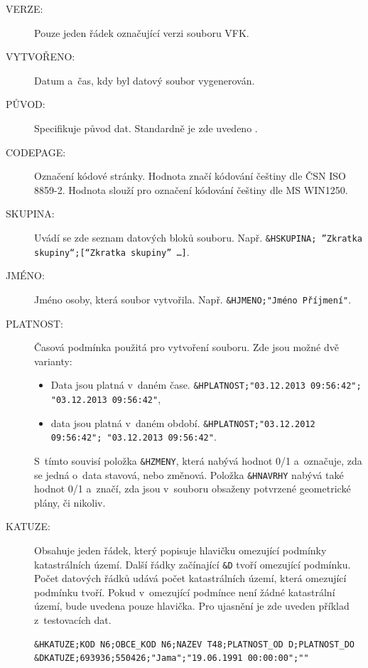 \documentclass[a4paper,12pt,oneside]{book}
\begin{document}
\begin{description}
 \item[VERZE:] Pouze jeden řádek označující verzi souboru VFK.
 \item[VYTVOŘENO:] Datum a~čas, kdy byl datový soubor vygenerován.
 \item[PŮVOD:] Specifikuje původ dat. Standardně je zde uvedeno
   .
 \item[CODEPAGE:] Označení kódové stránky. Hodnota 
   značí kódování češtiny dle ČSN ISO 8859-2. Hodnota
    slouží pro označení kódování češtiny dle MS
   WIN1250.
 \item[SKUPINA:] Uvádí se zde seznam datových bloků
   souboru. Např. \texttt{\&HSKUPINA; ”Zkratka skupiny“;[“Zkratka
     skupiny” \dots]}.
 \item[JMÉNO:] Jméno osoby, která soubor
   vytvořila. Např. \texttt{\&HJMENO;"Jméno Příjmení"}.
 \item[PLATNOST:] Časová podmínka použitá pro vytvoření souboru. Zde
   jsou možné dvě varianty:
 
 \begin{itemize}
 \item Data jsou platná v~daném čase. \texttt{\&HPLATNOST;"03.12.2013
     09:56:42"; "03.12.2013 09:56:42"},
 \item data jsou platná v~daném
   období. \texttt{\&HPLATNOST;"03.12.2012 09:56:42"; "03.12.2013
     09:56:42"}.
 \end{itemize}
 
 S~tímto souvisí položka \texttt{\&HZMENY}, která nabývá hodnot 0/1
 a~označuje, zda se jedná o~data stavová, nebo změnová. Položka
 \texttt{\&HNAVRHY} nabývá také hodnot 0/1 a~značí, zda jsou v~souboru
 obsaženy potvrzené geometrické plány, či nikoliv.
 
\item[KATUZE:] Obsahuje jeden řádek, který popisuje hlavičku omezující
  podmínky katastrálních území. Další řádky začínající \texttt{\&D}
  tvoří omezující podmínku. Počet datových řádků udává počet
  katastrálních území, která omezující podmínku tvoří. Pokud
  v~omezující podmínce není žádné katastrální území, bude uvedena
  pouze hlavička. Pro ujasnění je zde uveden příklad z~testovacích
  dat.
 
 \begin{lstlisting}
&HKATUZE;KOD N6;OBCE_KOD N6;NAZEV T48;PLATNOST_OD D;PLATNOST_DO
&DKATUZE;693936;550426;"Jama";"19.06.1991 00:00:00";""
 \end{lstlisting}


\end{description}
\end{document}
